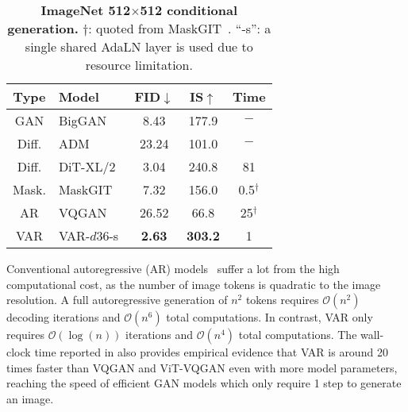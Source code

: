 \begin{wraptable}[14]{r}{0.49\textwidth}
\renewcommand\arraystretch{1.06}
\centering
\small
{
\vspace{-12pt}
\caption{\smallcaption
\textbf{ImageNet 512$\times$512 conditional generation.}
$\dag$: quoted from MaskGIT~\cite{maskgit}. ``-s'': a single shared AdaLN layer is used due to resource limitation.
}\label{tab:512}
\vspace{5pt}
{
\begin{tabular}{c|l|ccc}%
\toprule
Type & Model          & FID$\downarrow$ & IS$\uparrow$   & Time \\
\midrule
GAN   & BigGAN~\cite{biggan}            & 8.43  & 177.9  & $-$ \\
\midrule
Diff. & ADM~\cite{adm}                  & 23.24 & 101.0  & $-$ \\
Diff. & DiT-XL/2~\cite{dit}             & 3.04  & 240.8  & 81 \\
\midrule
Mask. & MaskGIT~\cite{maskgit}          & 7.32  & 156.0  & 0.5$^\dag$ \\
\midrule
AR    & VQGAN~\cite{vqgan}              & 26.52 & 66.8   & 25$^\dag$ \\
VAR   & VAR-$d36$-s    & \textbf{2.63}  & \textbf{303.2} & 1 \\
\bottomrule
\end{tabular}
}
\vspace{-3pt}
}
\end{wraptable}
    
    
Conventional autoregressive (AR) models~\cite{vqgan,vqvae2,vit-vqgan,rq} suffer a lot from the high computational cost, as the number of image tokens is quadratic to the image resolution.
A full autoregressive generation of $n^2$ tokens requires $\mathcal{O}(n^2)$ decoding iterations and $\mathcal{O}(n^6)$ total computations.
In contrast, VAR only requires $\mathcal{O}(\log(n))$ iterations and $\mathcal{O}(n^4)$ total computations.
The wall-clock time reported in  also provides empirical evidence that VAR is around 20 times faster than VQGAN and ViT-VQGAN even with more model parameters, reaching the speed of efficient GAN models which only require 1 step to generate an image.

